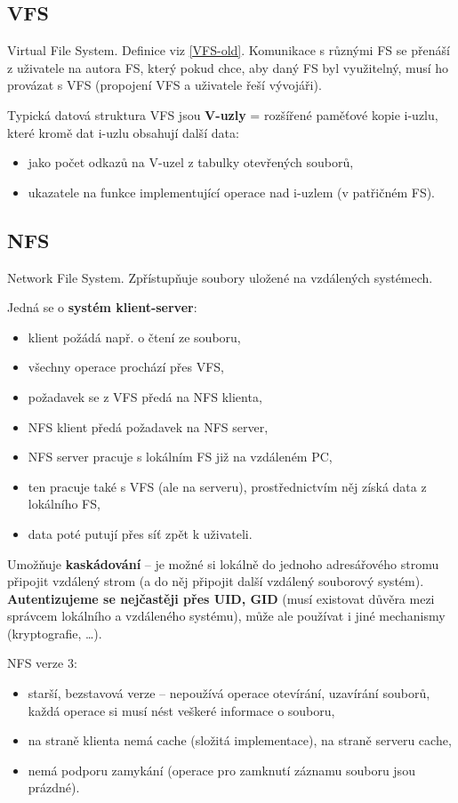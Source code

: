 \documentclass[a4paper, 11pt]{article}
\begin{document}
\subsection{VFS} \label{VFS-new}
Virtual File System. Definice viz \ref{VFS-old}. Komunikace s různými FS se přenáší z uživatele na autora FS, který pokud chce, aby daný FS byl využitelný, musí ho provázat s VFS (propojení VFS a uživatele řeší vývojáři).
 
Typická datová struktura VFS jsou \textbf{V-uzly} = rozšířené paměťové kopie i-uzlu, které kromě dat i-uzlu obsahují další data:
\begin{itemize}
    \item jako počet odkazů na V-uzel z tabulky otevřených souborů, 
    \item ukazatele na funkce implementující operace nad i-uzlem (v patřičném FS).
\end{itemize}
 
\subsection{NFS} \label{NFS-more}
Network File System. Zpřístupňuje soubory uložené na vzdálených systémech.
 
Jedná se o \textbf{systém klient-server}:
\begin{itemize}
    \item klient požádá např. o čtení ze souboru,
    \item všechny operace prochází přes VFS,
    \item požadavek se z VFS předá na NFS klienta,
    \item NFS klient předá požadavek na NFS server,
    \item NFS server pracuje s lokálním FS již na vzdáleném PC,
    \item ten pracuje také s VFS (ale na serveru), prostřednictvím něj získá data z lokálního FS,
    \item data poté putují přes síť zpět k uživateli.
\end{itemize}
 
Umožňuje \textbf{kaskádování} -- je možné si lokálně do jednoho adresářového stromu připojit vzdálený strom (a do něj připojit další vzdálený souborový systém). \textbf{Autentizujeme se nejčastěji přes UID, GID} (musí existovat důvěra mezi správcem lokálního a vzdáleného systému), může ale používat i jiné mechanismy (kryptografie, \ldots).
 
NFS verze 3:
\begin{itemize}
    \item starší, bezstavová verze -- nepoužívá operace otevírání, uzavírání souborů, každá operace si musí nést veškeré informace o souboru,
    \item na straně klienta nemá cache (složitá implementace), na straně serveru cache,
    \item nemá podporu zamykání (operace pro zamknutí záznamu souboru jsou prázdné).
\end{itemize}
 
\end{document}

